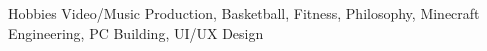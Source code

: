 \documentclass{resume} %
\begin{document}
\begin{rSection}{Hobbies} 
Video/Music Production, Basketball, Fitness, Philosophy, Minecraft Engineering, PC Building, UI/UX Design

\end{rSection}
\end{document}

